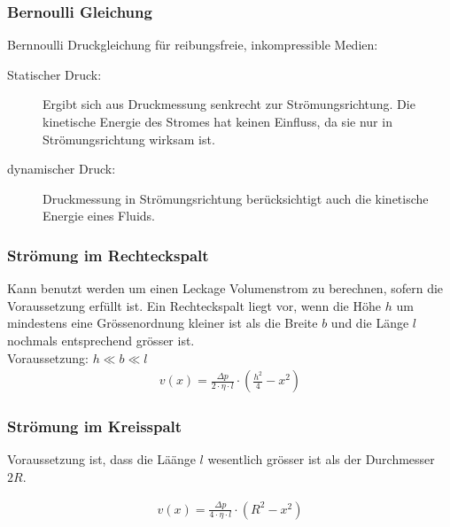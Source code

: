\subsubsection{Bernoulli Gleichung}
Bernnoulli Druckgleichung für reibungsfreie, inkompressible Medien:

\begin{description}
\item[Statischer Druck:] Ergibt sich aus Druckmessung senkrecht zur Strömungsrichtung. Die kinetische Energie des Stromes hat keinen Einfluss, da sie nur in Strömungsrichtung wirksam ist.
\item[dynamischer Druck:] Druckmessung in Strömungsrichtung berücksichtigt auch die kinetische Energie eines Fluids.
\end{description}





\subsubsection{Strömung im Rechteckspalt}
Kann benutzt werden um einen Leckage Volumenstrom zu berechnen, sofern die Voraussetzung erfüllt ist. Ein Rechteckspalt liegt vor, wenn die Höhe $h$ um mindestens eine Grössenordnung kleiner ist als die Breite $b$ und die Länge $l$ nochmals entsprechend grösser ist. \\


Voraussetzung: $h \ll b \ll l$ \\


\begin{align*}
v(x) = \frac{\Delta p}{2 \cdot \eta \cdot l} \cdot ( \frac{h^2}{4} - x^2)
\end{align*}



\subsubsection{Strömung im Kreisspalt}
Voraussetzung ist, dass die Läänge $l$ wesentlich grösser ist als der Durchmesser $2R$.

\begin{align*}
v(x) = \frac{\Delta p}{4 \cdot \eta \cdot l} \cdot (R^2 - x^2)
\end{align*}

